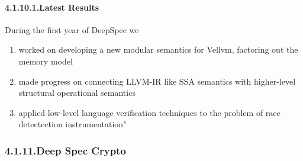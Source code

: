 \documentclass[12pt,twoside]{article}
\begin{document}
\paragraph{4.1.10.1.\hspace*{0.5em}Latest Results}\label{sec-latest-results}%

\noindent{}During the first year of DeepSpec we%

\begin{enumerate}%

\item{}
worked on developing a new modular semantics for Vellvm, factoring out the memory model%

\item{}
made progress on connecting LLVM-IR like SSA semantics with higher-level structural operational semantics%

\item{}
applied low-level language verification techniques to the problem of race detectection instrumentation"%
\end{enumerate}%

\subsubsection{4.1.11.\hspace*{0.5em}Deep Spec Crypto}\label{sec-deep-spec-crypto}%
\end{document}

